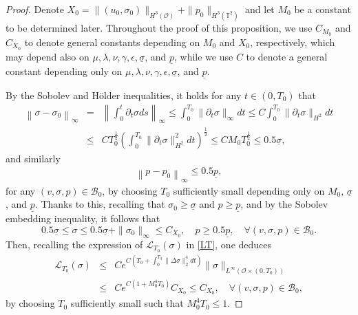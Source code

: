 \documentclass[12pt,reqno]{amsart}
\numberwithin{equation}{section}
\begin{document}
\begin{proof}
Denote $X_0=\|(u_0, \sigma_0)\|_{H^3(\mathcal O)}+\|p_0\|_{H^3(\mathbb T^2)}$ and let $M_0$ be a constant to be determined later.
Throughout the proof of this proposition, we use $C_{M_0}$ and $C_{X_0}$ to denote general constants depending on $M_0$ and $X_0$, respectively, which may depend also on $\mu, \lambda, \nu, \gamma, \epsilon, \underline\sigma$, and $\underline p$, while we use $C$ to denote a general constant depending only on $\mu, \lambda, \nu, \gamma, \epsilon, \underline\sigma$, and $\underline p$.

By the Sobolev and H\"older inequalities, it holds for any $t\in (0,T_0)$ that
\begin{eqnarray}
  \left\|\sigma-\sigma_0\right\|_\infty&=&\left\|\int_0^t\partial_t\sigma ds\right\|_\infty
  \leq\int_0^{T_0}\|\partial_t\sigma\|_\infty dt\leq C\int_0^{T_0}\|\partial_t\sigma\|_{H^2}dt\nonumber\\
  &\leq& CT_0^\frac12\left(\int_0^{T_0}\|\partial_t\sigma\|_{H^2}^2dt\right)^\frac12
  \leq CM_0T_0^\frac12\leq0.5\underline\sigma,\label{ESTSIGMAINFTY}
\end{eqnarray}
and similarly
\begin{eqnarray*}
  \left\|p-p_0\right\|_\infty
  \leq0.5\underline p,
\end{eqnarray*}
for any $(v,\sigma,p)\in\mathscr B_0$, by choosing $T_0$ sufficiently small depending only on $M_0$, $\underline\sigma$, and $\underline p$. Thanks to this,
recalling that $\sigma_0\geq\underline\sigma$ and $p\geq\underline p$, and by the Sobolev embedding inequality, it follows that
\begin{equation}
  0.5\underline\sigma\leq\sigma\leq0.5\underline\sigma+\|\sigma_0\|_\infty \leq C_{X_0},\quad p\geq0.5\underline p, \quad \forall (v,\sigma,p)\in\mathscr B_0. \label{ESTSIGMA}
\end{equation}
Then, recalling the expression of $\mathcal L_{T_0}(\sigma)$ in \eqref{LT}, one deduces
\begin{eqnarray}
  \mathcal L_{T_0}(\sigma)&\leq&Ce^{C\left(T_0+\int_0^{T_0}\|\Delta\sigma\|_2^4dt\right)}\|\sigma\|_{L^\infty(\mathcal O\times(0,T_0))}\nonumber\\
  &\leq&Ce^{C\left(1+M_0^4T_0\right)}C_{X_0}
  \leq C_{X_0},\quad \forall (v,\sigma,p)\in\mathscr B_0, \label{ESTLT}
\end{eqnarray}
by choosing $T_0$ sufficiently small such that $M_0^4T_0\leq1$.


\end{proof}
\end{document}
